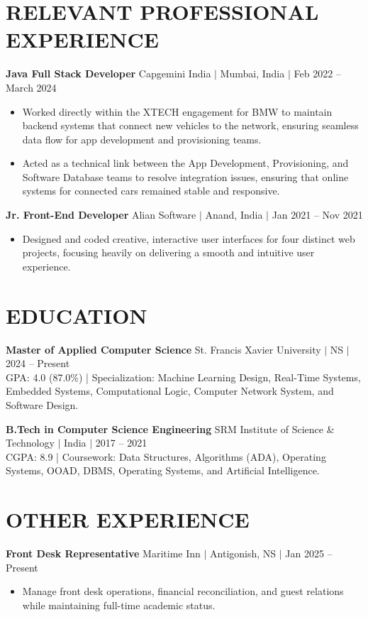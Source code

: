 \documentclass[10pt,a4paper]{article}
\begin{document}
\section*{RELEVANT PROFESSIONAL EXPERIENCE}

\textbf{Java Full Stack Developer} \hfill Capgemini India $|$ Mumbai, India $|$ Feb 2022 -- March 2024
\begin{itemize}
\item Worked directly within the XTECH engagement for BMW to maintain backend systems that connect new vehicles to the network, ensuring seamless data flow for app development and provisioning teams.
\item Acted as a technical link between the App Development, Provisioning, and Software Database teams to resolve integration issues, ensuring that online systems for connected cars remained stable and responsive.
\end{itemize}

\textbf{Jr. Front-End Developer} \hfill Alian Software $|$ Anand, India $|$ Jan 2021 -- Nov 2021
\begin{itemize}
\item Designed and coded creative, interactive user interfaces for four distinct web projects, focusing heavily on delivering a smooth and intuitive user experience.
\end{itemize}

\section*{EDUCATION}

\textbf{Master of Applied Computer Science} \hfill St. Francis Xavier University $|$ NS $|$ 2024 -- Present \\
GPA: 4.0 (87.0\%) | Specialization: Machine Learning Design, Real-Time Systems, Embedded Systems, Computational Logic, Computer Network System, and Software Design.

\textbf{B.Tech in Computer Science Engineering} \hfill SRM Institute of Science \& Technology $|$ India $|$ 2017 -- 2021 \\
CGPA: 8.9 | Coursework: Data Structures, Algorithms (ADA), Operating Systems, OOAD, DBMS, Operating Systems, and Artificial Intelligence.

\section*{OTHER EXPERIENCE}

\textbf{Front Desk Representative} \hfill Maritime Inn $|$ Antigonish, NS $|$ Jan 2025 -- Present
\begin{itemize}
\item Manage front desk operations, financial reconciliation, and guest relations while maintaining full-time academic status.
\end{itemize}
\end{document}

